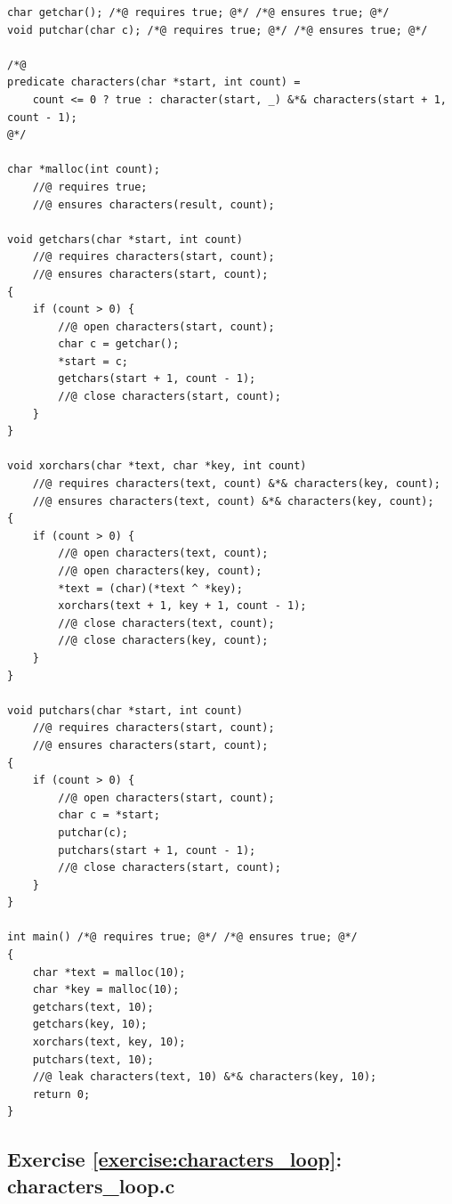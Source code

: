 \documentclass{article}
\begin{document}
\begin{lstlisting}
char getchar(); /*@ requires true; @*/ /*@ ensures true; @*/
void putchar(char c); /*@ requires true; @*/ /*@ ensures true; @*/

/*@
predicate characters(char *start, int count) =
    count <= 0 ? true : character(start, _) &*& characters(start + 1, count - 1);
@*/

char *malloc(int count);
    //@ requires true;
    //@ ensures characters(result, count);

void getchars(char *start, int count)
    //@ requires characters(start, count);
    //@ ensures characters(start, count);
{
    if (count > 0) {
        //@ open characters(start, count);
        char c = getchar();
        *start = c;
        getchars(start + 1, count - 1);
        //@ close characters(start, count);
    }
}

void xorchars(char *text, char *key, int count)
    //@ requires characters(text, count) &*& characters(key, count);
    //@ ensures characters(text, count) &*& characters(key, count);
{
    if (count > 0) {
        //@ open characters(text, count);
        //@ open characters(key, count);
        *text = (char)(*text ^ *key);
        xorchars(text + 1, key + 1, count - 1);
        //@ close characters(text, count);
        //@ close characters(key, count);
    }
}

void putchars(char *start, int count)
    //@ requires characters(start, count);
    //@ ensures characters(start, count);
{
    if (count > 0) {
        //@ open characters(start, count);
        char c = *start;
        putchar(c);
        putchars(start + 1, count - 1);
        //@ close characters(start, count);
    }
}

int main() /*@ requires true; @*/ /*@ ensures true; @*/
{
    char *text = malloc(10);
    char *key = malloc(10);
    getchars(text, 10);
    getchars(key, 10);
    xorchars(text, key, 10);
    putchars(text, 10);
    //@ leak characters(text, 10) &*& characters(key, 10);
    return 0;
}
\end{lstlisting}

\subsection{Exercise \ref{exercise:characters_loop}: characters\_loop.c}\label{solution:characters_loop}
\end{document}
